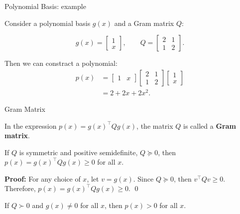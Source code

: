 \documentclass{beamer}
\begin{document}
\begin{frame}{Polynomial Basis: example}
	\begin{flushleft}
		
		
		Consider a polynomial basis $g(x)$ and a Gram matrix $Q$:
		
		\[
		g(x)=
		\begin{bmatrix}
			1\\x
		\end{bmatrix},
		\qquad
		Q=
		\begin{bmatrix}
			2&1\\
			1&2
		\end{bmatrix}.
		\]
		
		Then we can constract a polynomial:
		\[
		\begin{aligned}
			p(x)
			&=
			\begin{bmatrix}1&x\end{bmatrix}
			\begin{bmatrix}2&1\\1&2\end{bmatrix}
			\begin{bmatrix}1\\x\end{bmatrix}\\
			&=2+2x+2x^2.
		\end{aligned}
		\]
		
	\end{flushleft}
\end{frame}



\begin{frame}{Gram Matrix}
	\begin{flushleft}
		In the expression $p(x)=g(x)^\top Qg(x)$, the matrix $Q$ is called a \textbf{Gram matrix}.
		
		\begin{theorem}
			If $Q$ is symmetric and positive semidefinite, $Q \succeq 0$, then $p(x)=g(x)^\top Qg(x) \geq 0$ for all $x$.
		\end{theorem}
		
		\textbf{Proof:} For any choice of $x$, let $v=g(x)$. Since $Q\succeq0$, then $v^\top Qv\geq0$. Therefore, $p(x)=g(x)^\top Qg(x)\geq0.$ \qed
		
		\bigskip
		
		If $Q\succ0$ and $g(x)\neq0$ for all $x$, then $p(x)>0$ for all $x$.
		
	\end{flushleft}
\end{frame}
\end{document}
